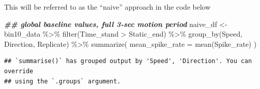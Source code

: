 \documentclass[
]{book}
\newenvironment{Shaded}{\begin{snugshade}}{\end{snugshade}}
\newcommand{\AttributeTok}[1]{\textcolor[rgb]{0.77,0.63,0.00}{#1}}
\newcommand{\DocumentationTok}[1]{\textcolor[rgb]{0.56,0.35,0.01}{\textbf{\textit{#1}}}}
\newcommand{\FunctionTok}[1]{\textcolor[rgb]{0.00,0.00,0.00}{#1}}
\newcommand{\NormalTok}[1]{#1}
\newcommand{\OtherTok}[1]{\textcolor[rgb]{0.56,0.35,0.01}{#1}}
\newcommand{\SpecialCharTok}[1]{\textcolor[rgb]{0.00,0.00,0.00}{#1}}
\begin{document}
This will be referred to as the ``naive'' approach in the code below

\begin{Shaded}
\begin{Highlighting}[]
\DocumentationTok{\#\# global baseline values, full 3{-}sec motion period}
\NormalTok{naive\_df }\OtherTok{\textless{}{-}}
\NormalTok{  bin10\_data }\SpecialCharTok{\%\textgreater{}\%}
  \FunctionTok{filter}\NormalTok{(Time\_stand }\SpecialCharTok{\textgreater{}}\NormalTok{ Static\_end) }\SpecialCharTok{\%\textgreater{}\%}
  \FunctionTok{group\_by}\NormalTok{(Speed, Direction, Replicate) }\SpecialCharTok{\%\textgreater{}\%}
  \FunctionTok{summarize}\NormalTok{(}
    \AttributeTok{mean\_spike\_rate =} \FunctionTok{mean}\NormalTok{(Spike\_rate)}
\NormalTok{  )}
\end{Highlighting}
\end{Shaded}

\begin{verbatim}
## `summarise()` has grouped output by 'Speed', 'Direction'. You can override
## using the `.groups` argument.
\end{verbatim}
\end{document}
